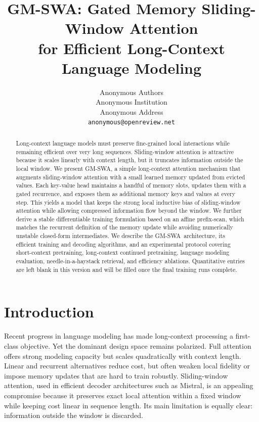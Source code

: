 \documentclass{article}
\title{GM-SWA: Gated Memory Sliding-Window Attention\\for Efficient Long-Context Language Modeling}
\author{%
Anonymous Authors \\
Anonymous Institution \\
Anonymous Address \\
\texttt{anonymous@openreview.net}
}
\newcommand{\model}{GM-SWA}
\begin{document}
\maketitle

\begin{abstract}
Long-context language models must preserve fine-grained local interactions while remaining efficient over very long sequences. Sliding-window attention is attractive because it scales linearly with context length, but it truncates information outside the local window. We present \model, a simple long-context attention mechanism that augments sliding-window attention with a small learned memory updated from evicted values. Each key-value head maintains a handful of memory slots, updates them with a gated recurrence, and exposes them as additional memory keys and values at every step. This yields a model that keeps the strong local inductive bias of sliding-window attention while allowing compressed information flow beyond the window. We further derive a stable differentiable training formulation based on an affine prefix-scan, which matches the recurrent definition of the memory update while avoiding numerically unstable closed-form intermediates. We describe the \model\ architecture, its efficient training and decoding algorithms, and an experimental protocol covering short-context pretraining, long-context continued pretraining, language modeling evaluation, needle-in-a-haystack retrieval, and efficiency ablations. Quantitative entries are left blank in this version and will be filled once the final training runs complete.
\end{abstract}

\section{Introduction}

Recent progress in language modeling has made long-context processing a first-class objective. Yet the dominant design space remains polarized. Full attention offers strong modeling capacity but scales quadratically with context length. Linear and recurrent alternatives reduce cost, but often weaken local fidelity or impose memory updates that are hard to train robustly. Sliding-window attention, used in efficient decoder architectures such as Mistral, is an appealing compromise because it preserves exact local attention within a fixed window while keeping cost linear in sequence length. Its main limitation is equally clear: information outside the window is discarded.
\end{document}
